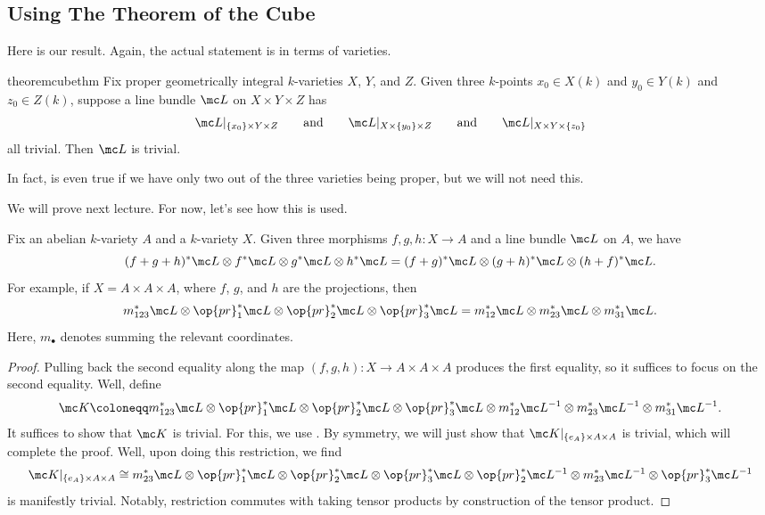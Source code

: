 \documentclass[../notes.tex]{subfiles}
\begin{document}
\subsection{Using The Theorem of the Cube}
Here is our result. Again, the actual statement is in terms of varieties.
\begin{restatable}{theorem}{cubethm} \label{thm:cube}
	Fix proper geometrically integral $k$-varieties $X$, $Y$, and $Z$. Given three $k$-points $x_0\in X(k)$ and $y_0\in Y(k)$ and $z_0\in Z(k)$, suppose a line bundle $\mc L$ on $X\times Y\times Z$ has
	\[\mc L|_{\{x_0\}\times Y\times Z}\qquad\text{and}\qquad\mc L|_{X\times\{y_0\}\times Z}\qquad\text{and}\qquad\mc L|_{X\times Y\times\{z_0\}}\]
	all trivial. Then $\mc L$ is trivial.
\end{restatable}
\begin{remark}
	In fact,  is even true if we have only two out of the three varieties being proper, but we will not need this.
\end{remark}
We will prove  next lecture. For now, let's see how this is used.
\begin{corollary} \label{cor:cube-av}
	Fix an abelian $k$-variety $A$ and a $k$-variety $X$. Given three morphisms $f,g,h\colon X\to A$ and a line bundle $\mc L$ on $A$, we have
	\[(f+g+h)^*\mc L\otimes f^*\mc L\otimes g^*\mc L\otimes h^*\mc L=(f+g)^*\mc L\otimes(g+h)^*\mc L\otimes(h+f)^*\mc L.\]
	For example, if $X=A\times A\times A$, where $f$, $g$, and $h$ are the projections, then
	\[m_{123}^*\mc L\otimes\op{pr}_1^*\mc L\otimes\op{pr}_2^*\mc L\otimes\op{pr}_3^*\mc L=m_{12}^*\mc L\otimes m_{23}^*\mc L\otimes m_{31}^*\mc L.\]
	Here, $m_\bullet$ denotes summing the relevant coordinates.
\end{corollary}
\begin{proof}
	Pulling back the second equality along the map $(f,g,h)\colon X\to A\times A\times A$ produces the first equality, so it suffices to focus on the second equality. Well, define
	\[\mc K\coloneqq m_{123}^*\mc L\otimes\op{pr}_1^*\mc L\otimes\op{pr}_2^*\mc L\otimes\op{pr}_3^*\mc L\otimes m_{12}^*\mc L^{-1}\otimes m_{23}^*\mc L^{-1}\otimes m_{31}^*\mc L^{-1}.\]
	It suffices to show that $\mc K$ is trivial. For this, we use . By symmetry, we will just show that $\mc K|_{\{e_A\}\times A\times A}$ is trivial, which will complete the proof. Well, upon doing this restriction, we find
	\[\mc K|_{\{e_A\}\times A\times A}\cong m_{23}^*\mc L\otimes\op{pr}_1^*\mc L\otimes\op{pr}_2^*\mc L\otimes\op{pr}_3^*\mc L\otimes \op{pr}_2^*\mc L^{-1}\otimes m_{23}^*\mc L^{-1}\otimes\op{pr}_{3}^*\mc L^{-1}\]
	is manifestly trivial. Notably, restriction commutes with taking tensor products by construction of the tensor product.
\end{proof}
\end{document}
